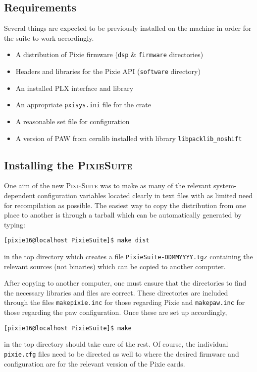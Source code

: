 \documentclass{article}
\begin{document}
\subsection{Requirements}
Several things are expected to be previously installed on the machine in order for the suite to work accordingly.
\begin{itemize}
\item A distribution of Pixie firmware (\texttt{dsp} \& \texttt{firmware} directories)
\item Headers and libraries for the Pixie API (\texttt{software} directory)
\item An installed PLX interface and library
\item An appropriate \texttt{pxisys.ini} file for the crate
\item A reasonable set file for configuration
\item A version of PAW from cernlib installed with library \texttt{libpacklib\_noshift}
\end{itemize}
\subsection{Installing the \textsc{PixieSuite}}
One aim of the new \textsc{PixieSuite} was to make as many of the relevant system-dependent configuration variables located clearly in text files with as limited need for recompilation as possible. The easiest way to copy the distribution from one place to another is through a tarball which can be automatically generated by typing:
\begin{verbatim}
[pixie16@localhost PixieSuite]$ make dist
\end{verbatim}
in the top directory which creates a file \texttt{PixieSuite-DDMMYYYY.tgz} containing the relevant sources (not binaries) which can be copied to another computer.

After copying to another computer, one must ensure that the directories to find the necessary libraries and files are correct. These directories are included through the files \texttt{makepixie.inc} for those regarding Pixie and \texttt{makepaw.inc} for those regarding the paw configuration. Once these are set up accordingly,
\begin{verbatim}
[pixie16@localhost PixieSuite]$ make
\end{verbatim}
in the top directory should take care of the rest. Of course, the individual \texttt{pixie.cfg} files need to be directed as well to where the desired firmware and configuration are for the relevant version of the Pixie cards.
\end{document}
